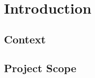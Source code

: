 \chapter{Introduction}
\label{sec:introduction}
\thispagestyle{fancy}

\lipsum[6]

\section{Context}

\lipsum[6]

\section{Project Scope}

\lipsum[6]

